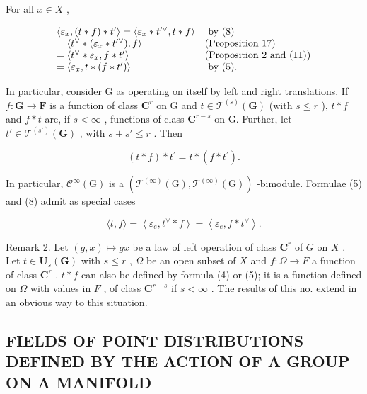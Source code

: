 For all \(x \in X\) ,

\[
\begin{array}{l l} \langle \varepsilon_ {x}, (t * f) * t ^ {\prime} \rangle = \langle \varepsilon_ {x} * t ^ {\prime \vee}, t * f \rangle & \text { by   (8) } \\ = \langle t ^ {\vee} * (\varepsilon_ {x} * t ^ {\prime \vee}), f \rangle & \text {(Proposition 17)} \\ = \langle t ^ {\vee} * \varepsilon_ {x}, f * t ^ {\prime} \rangle & \text {(Proposition 2 and (11))} \\ = \langle \varepsilon_ {x}, t * (f * t ^ {\prime}) \rangle & \text { by   (5). } \end{array}
\]

In particular, consider G as operating on itself by left and right translations. If \(f \colon \mathbf{G} \to \mathbf{F}\) is a function of class \(\mathbf{C}^r\) on G and \(t \in \mathcal{T}^{(s)}(\mathbf{G})\) (with \(s \leqslant r\) ), \(t * f\) and \(f * t\) are, if \(s < \infty\) , functions of class \(\mathbf{C}^{r - s}\) on G. Further, let \(t' \in \mathcal{T}^{(s')}(\mathbf{G})\) , with \(s + s' \leqslant r\) . Then

\[
(t * f) * t ^ {\prime} = t * (f * t ^ {\prime}).\tag{14}
\]

In particular, \(\mathcal{C}^{\infty}(\mathrm{G})\) is a \((\mathcal{T}^{(\infty)}(\mathrm{G}),\mathcal{T}^{(\infty)}(\mathrm{G}))\) -bimodule. Formulae (5) and (8) admit as special cases

\[
\langle t, f \rangle = \left\langle \varepsilon_ {e}, t ^ {\vee} * f \right\rangle = \left\langle \varepsilon_ {e}, f * t ^ {\vee} \right\rangle .\tag{15}
\]

Remark 2. Let \((g,x)\mapsto gx\) be a law of left operation of class \(\mathbf{C}^r\) of \(G\) on \(X\) . Let \(t\in \mathbf{U}_s(\mathbf{G})\) with \(s\leqslant r\) , \(\Omega\) be an open subset of \(X\) and \(f\colon \Omega \to F\) a function of class \(\mathbf{C}^r\) . \(t*f\) can also be defined by formula (4) or (5); it is a function defined on \(\Omega\) with values in \(F\) , of class \(\mathbf{C}^{r - s}\) if \(s < \infty\) . The results of this no. extend in an obvious way to this situation.

\subsection{FIELDS OF POINT DISTRIBUTIONS DEFINED BY THE ACTION OF A GROUP ON A MANIFOLD}

